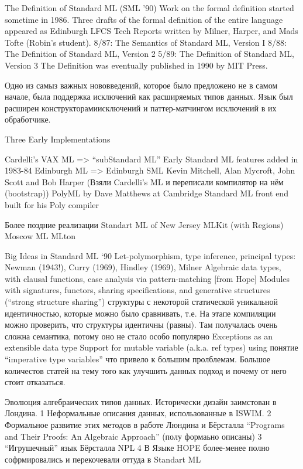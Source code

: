 \documentclass[14pt]{matmex-diploma-custom}
\begin{document}
The Definition of Standard ML (SML ’90)
Work on the formal definition started sometime in 1986. Three drafts of
the formal definition of the entire language appeared as Edinburgh LFCS
Tech Reports written by Milner, Harper, and Mads Tofte (Robin’s student).
8/87: The Semantics of Standard ML, Version I
8/88: The Definition of Standard ML, Version 2
5/89: The Definition of Standard ML, Version 3
The Definition was eventually published in 1990 by MIT Press.

Одно из самыз важных нововведений, которое было предложено не в самом начале, была поддержка исключений как расширяемых типов данных. Язык был расширен конструкторамиисключений и паттер-матчингом исключений в их обработчике. 

Three Early Implementations

Cardelli’s VAX ML => “subStandard ML”
Early Standard ML features added in 1983-84
Edinburgh ML => Edinburgh SML
Kevin Mitchell, Alan Mycroft, John Scott and Bob Harper (Взяли Cardelli’s ML и переписали компилятор на нём (bootstrap))
PolyML by Dave Matthews at Cambridge
Standard ML front end built for his Poly compiler

Более поздние реализации
Standart ML of New Jersey
MLKit (with Regions)
Moscow ML
MLton


Big Ideas in Standard ML ‘90
Let-polymorphism, type inference, principal types: Newman (1943!), Curry (1969), Hindley (1969), Milner
Algebraic data types, with clausal functions, case analysis via pattern-matching [from Hope]
Modules with signatures, functors, sharing specifications, and generative structures (“strong structure sharing”) структуры  с  некоторой статической уникальной идентичностью, которые  можно было сравнивать, т.е. На этапе компиляции можно проверить, что структуры идентичны (равны). Там получалась очень сложна семантика, потому оно не стало особо популярно
Exceptions as an extensible data type
Support for mutable variable (a.k.a. ref types) using понятие “imperative type variables” что привело к большим пролблемам. Большое количестов статей на тему того как улучшить данных подход и почему от него стоит отказаться.

Эволюция алгебраических типов данных.
Исторически дизайн заимстован в Лондина. 
1 Неформальные описания данных, использованные в ISWIM.
2 Формальное развитие этих методов в работе Люндина и Бёрсталла “Programs and Their Proofs: An Algebraic Approach” (полу формаьно описаны)
3 “Игрушечный” язык Бёрсталла NPL
4 В Языке HOPE более-менее полно софрмировались и перекочевали оттуда в Standart ML
\end{document}
